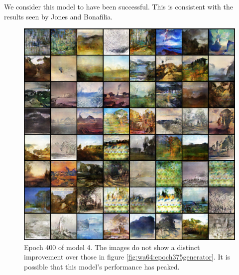 \documentclass[11pt,letterpaper]{article}
\begin{document}
				We consider this model to have been successful.
				This is consistent with the results seen by Jones and Bonafilia\cite{otherGanGogh}.
				\begin{figure}
					\centering
					\includegraphics[width=1.0\linewidth]{results/model4/epoch400_generator}
					\caption{Epoch 400 of model 4. The images do not show a distinct improvement over those in figure \ref{fig:wa64:epoch375generator}. It is possible that this model's performance has peaked.}
					\label{fig:wa64:epoch400generator}
				\end{figure}
\end{document}
